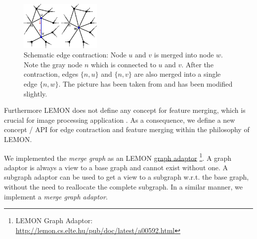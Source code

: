 \begin{figure}[H]
    \centering
    \includegraphics[width=0.35\textwidth]{fig/contraction.pdf}

    \caption[Schematic edge contraction]{ Schematic edge contraction: Node $u$ and $v$ is merged into node $w$.
        Note the gray node $n$ which is connected to $u$ and $v$.
        After the contraction, edges $\{ n,u\}$ and $\{ n,v\}$ are also merged into 
        a single edge $\{ n, w\}$.
        The picture has been taken from \citep{wiki_edge_contraction} and has been modified slightly.
    }
    \label{fig:e_contract}
\end{figure}


Furthermore LEMON does not define any concept for feature merging, which
is crucial for image processing application \citep{arbelaez_2006_cvpr}.
As a consequence, we define a new concept / API for 
edge contraction and feature merging within the philosophy of LEMON.

We implemented the \emph{merge graph} as an LEMON  \href{http://lemon.cs.elte.hu/pub/doc/latest/a00592.html}{graph adaptor}
\footnote{ LEMON Graph Adaptor: \url{http://lemon.cs.elte.hu/pub/doc/latest/a00592.html} }.
A graph adaptor is always a view to a base graph and cannot exist without one.
A subgraph adaptor can be used to get a view to a subgraph w.r.t. the base graph, without
the need to reallocate the complete subgraph.
In a similar manner, we implement a \emph{merge graph adaptor}.

